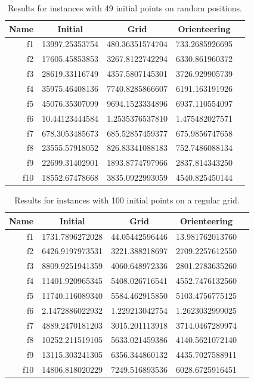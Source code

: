 \documentclass[smallextended]{svjour3}
\begin{document}
\begin{table}[!htbp]
  \centering
  \caption{Results for instances with 49 initial points on random positions.}
%
\begin{tabular}{r|SSSS}
  \toprule
  {Name} & {Initial} & {Grid} & {Orienteering} \\
  \midrule
  f1  & 13997.25353754 & 480.36351574704 & 733.2685926695  \\ 
  f2  & 17605.45853853 & 3267.8122742294 & 6330.861960372  \\ 
  f3  & 28619.33116749 & 4357.5807145301 & 3726.929905739  \\ 
  f4  & 35975.46408136 & 7740.8285866607 & 6191.163191926  \\ 
  f5  & 45076.35307099 & 9694.1523334896 & 6937.110554097  \\ 
  f6  & 10.44123444584 & 1.2535376537810 & 1.475482027571  \\ 
  f7  & 678.3053485673 & 685.52857459377 & 675.9856747658  \\ 
  f8  & 23555.57918052 & 826.83341088183 & 752.7486088134  \\ 
  f9  & 22699.31402901 & 1893.8774797966 & 2837.814343250  \\ 
  f10 & 18552.67478668 & 3835.0922993059 & 4540.825450144  \\
  \bottomrule
\end{tabular}
  \label{tab:res49b}
\end{table}



\begin{table}[!htbp]
  \centering
  \caption{Results for instances with 100 initial points on a regular grid.}
%
\begin{tabular}{r|SSSS}
  \toprule
  {Name} & {Initial} & {Grid} & {Orienteering} \\
  \midrule
  f1  & 1731.7896272028 & 44.05442596446 & 13.981762013760  \\ 
  f2  & 6426.9197973531 & 3221.388218697 & 2709.2257612550  \\ 
  f3  & 8809.9251941359 & 4060.648972336 & 2801.2783635260  \\ 
  f4  & 11401.920965345 & 5408.026716541 & 4552.7476132560  \\ 
  f5  & 11740.116089340 & 5584.462915850 & 5103.4756775125  \\ 
  f6  & 2.1472886022932 & 1.229213042754 & 1.2623032999025  \\ 
  f7  & 4889.2470181203 & 3015.201113918 & 3714.0467289974  \\ 
  f8  & 10252.211519105 & 5633.021459386 & 4140.5621072140  \\ 
  f9  & 13115.303241305 & 6356.344860132 & 4435.7027588911  \\ 
  f10 & 14806.818020229 & 7249.516893536 & 6028.6725916451  \\
  \bottomrule
\end{tabular}
  \label{tab:res100a}
\end{table}
\end{document}
